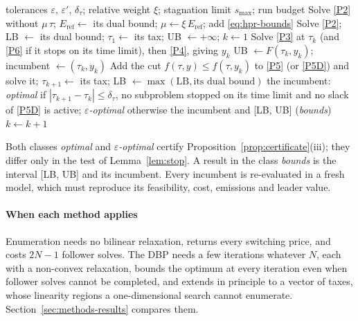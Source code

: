 \documentclass[review,11pt,nonatbib]{elsarticle}
\theoremstyle{remark}
\newcommand{\Eref}{E_{\mathrm{ref}}}
\begin{document}
\begin{algorithm}[!htbp]
\caption{Deterministic bounding procedure (DBP) for the tax problem \eqref{eq:bilevel}, adapted from \textcite{soares2021deterministic}.}\label{alg:dbp}
\begin{algorithmic}[1]
\Require tolerances $\varepsilon$, $\varepsilon'$, $\delta_\tau$; relative weight $\xi$; stagnation limit $s_{\max}$; run budget
\State Solve \eqref{P2} without $\mu\,\tau$; $\Eref \gets$ its dual bound; $\mu \gets \xi\,\Eref$; add \eqref{eq:hpr-bounds}
\State Solve \eqref{P2}; LB $\gets$ its dual bound; $\tau_1 \gets$ its tax; UB $\gets +\infty$; $k \gets 1$
\Loop
  \State Solve \eqref{P3} at $\tau_k$ (and \eqref{P6} if it stops on its time limit), then \eqref{P4}, giving $y_k$
   UB $\gets F(\tau_k, y_k)$; incumbent $\gets (\tau_k, y_k)$ \EndIf
  \State Add the cut $f(\tau, y) \le f(\tau, y_k)$ to \eqref{P5} (or \eqref{P5D}) and solve it; $\tau_{k+1} \gets$ its tax; LB $\gets \max(\mathrm{LB}, \text{its dual bound})$
     \State \Return the incumbent: \emph{optimal} if $|\tau_{k+1} - \tau_k| \le \delta_\tau$, no subproblem stopped on its time limit and no slack of \eqref{P5D} is active; \emph{$\varepsilon$-optimal} otherwise
  \EndIf
   \Return the incumbent and [LB, UB] (\emph{bounds}) \EndIf
  \State $k \gets k + 1$
\EndLoop
\end{algorithmic}
\end{algorithm}

Both classes \emph{optimal} and \emph{$\varepsilon$-optimal} certify Proposition~\ref{prop:certificate}(iii); they differ only in the test of Lemma~\ref{lem:stop}. A result in the class \emph{bounds} is the interval [LB, UB] and its incumbent. Every incumbent is re-evaluated in a fresh model, which must reproduce its feasibility, cost, emissions and leader value.

\paragraph{When each method applies} Enumeration needs no bilinear relaxation, returns every switching price, and costs $2N - 1$ follower solves. The DBP needs a few iterations whatever $N$, each with a non-convex relaxation, bounds the optimum at every iteration even when follower solves cannot be completed, and extends in principle to a vector of taxes, whose linearity regions a one-dimensional search cannot enumerate. Section~\ref{sec:methods-results} compares them.
\end{document}
